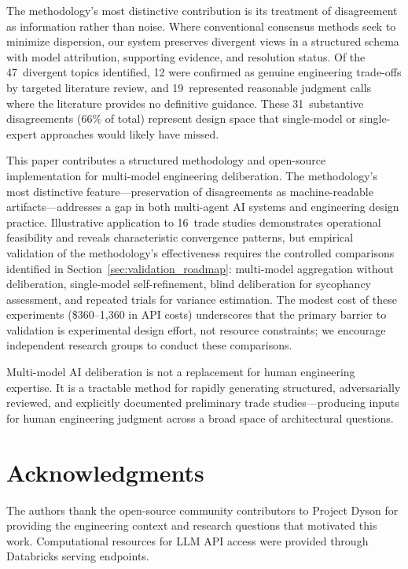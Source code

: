 \documentclass[11pt,a4paper]{article}
\begin{document}
The methodology's most distinctive contribution is its treatment of disagreement as information rather than noise. Where conventional consensus methods seek to minimize dispersion, our system preserves divergent views in a structured schema with model attribution, supporting evidence, and resolution status. Of the 47~divergent topics identified, 12 were confirmed as genuine engineering trade-offs by targeted literature review, and 19~represented reasonable judgment calls where the literature provides no definitive guidance. These 31~substantive disagreements (66\% of total) represent design space that single-model or single-expert approaches would likely have missed.

This paper contributes a structured methodology and open-source implementation for multi-model engineering deliberation. The methodology's most distinctive feature---preservation of disagreements as machine-readable artifacts---addresses a gap in both multi-agent AI systems and engineering design practice. Illustrative application to 16~trade studies demonstrates operational feasibility and reveals characteristic convergence patterns, but empirical validation of the methodology's effectiveness requires the controlled comparisons identified in Section~\ref{sec:validation_roadmap}: multi-model aggregation without deliberation, single-model self-refinement, blind deliberation for sycophancy assessment, and repeated trials for variance estimation. The modest cost of these experiments (\$360--1{,}360 in API costs) underscores that the primary barrier to validation is experimental design effort, not resource constraints; we encourage independent research groups to conduct these comparisons.

Multi-model AI deliberation is not a replacement for human engineering expertise. It is a tractable method for rapidly generating structured, adversarially reviewed, and explicitly documented preliminary trade studies---producing inputs for human engineering judgment across a broad space of architectural questions.

\section*{Acknowledgments}

The authors thank the open-source community contributors to Project Dyson for providing the engineering context and research questions that motivated this work. Computational resources for LLM API access were provided through Databricks serving endpoints.
\end{document}
